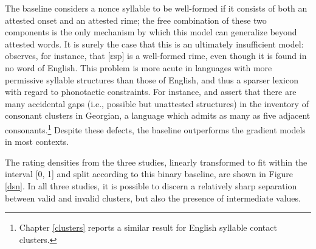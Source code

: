 The baseline considers a nonce syllable to be well-formed if it consists of both an attested onset and an attested rime; the free combination of these two components is the only mechanism by which this model can generalize beyond attested words. It is surely the case that this is an ultimately insufficient model: \citet{Albright2009a} observes, for instance, that [ɛsp] is a well-formed rime, even though it is found in no word of English. This problem is more acute in languages with more permissive syllable structures than those of English, and thus a sparser lexicon with regard to phonotactic constraints. For instance, \citet{Fischer-Jorgensen1952} and \citet{Vogt1954} assert that there are many accidental gaps (i.e., possible but unattested structures) in the inventory of consonant clusters in Georgian, a language which admits as many as five adjacent consonants.\footnote{Chapter \ref{clusters} reports a similar result for English syllable contact clusters.} Despite these defects, the baseline outperforms the gradient models in most contexts.

The rating densities from the three studies, linearly transformed to fit within the interval [0, 1] and split according to this binary baseline, are shown in Figure \ref{dsn}. In all three studies, it is possible to discern a relatively sharp separation between valid and invalid clusters, but also the presence of intermediate values.

